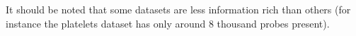 \documentclass[12pt]{article} %
\begin{document}
	It should be noted that some datasets are less information rich than others (for instance the platelets dataset has only around 8 thousand probes present). 
	
%	
%	
%	
	
	
\end{document}
